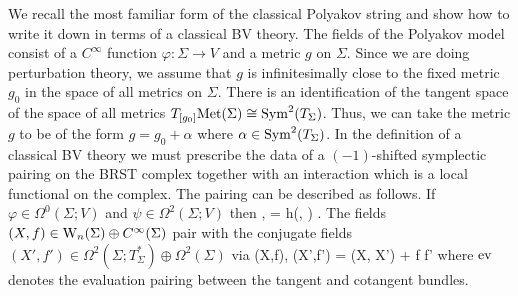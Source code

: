 We recall the most familiar form of the classical Polyakov string and show how to write it down in terms of a classical BV theory. The fields of the Polyakov model consist of a $C^\infty$ function $\varphi : \Sigma \to V$ and a metric $g$ on $\Sigma$. Since we are doing perturbation theory, we assume that $g$ is infinitesimally close to the fixed metric $g_0$ in the space of all metrics on $\Sigma$. There is an identification of the tangent space of the space of all metrics $T_{[g_0]} {\rm Met}(\Sigma) \cong {\rm Sym}^2(T_\Sigma)$. Thus, we can take the metric $g$ to be of the form $g = g_0 + \alpha$ where $\alpha \in {\rm Sym}^2(T_\Sigma)$. 
 In the definition of a classical BV theory we must prescribe the data of a $(-1)$-shifted symplectic pairing on the BRST complex together with an interaction which is a local functional on the complex. The pairing can be described as follows. If $\varphi \in \Omega^0(\Sigma ; V)$ and $\psi \in \Omega^2(\Sigma ; V)$ then
\ben
\<\varphi, \psi \> = \int h(\varphi, \psi) .
\een 
The fields $(X, f) \in {{\rm W}_n}(\Sigma) \oplus C^\infty(\Sigma)$ pair with the conjugate fields $(X', f') \in  \Omega^2(\Sigma ; T^*_\Sigma) \oplus \Omega^2(\Sigma)$ via
\ben
\<(X,f), (X',f')\> = \int \ev(X, X') + \int f f' 
\een
where ${\rm ev}$ denotes the evaluation pairing between the tangent and cotangent bundles. 

%

